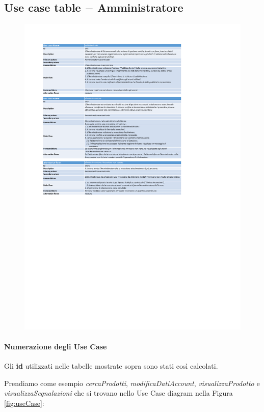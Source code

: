 \subsection{Use case table $-$ Amministratore}
\begin{figure}[h!]
    \centering
    \includegraphics[trim= 1.8cm 13cm 5cm 1.9cm, clip]{Deliverables/first-deliverable/img/UseCase/UseCase-Table-Amministrator.pdf}
\end{figure}

\paragraph{Numerazione degli Use Case}

Gli \textbf{id} utilizzati nelle tabelle mostrate sopra sono stati così calcolati.

Prendiamo come esempio \textit{cercaProdotti}, \textit{modificaDatiAccount}, \textit{visualizzaProdotto} e \textit{visualizzaSegnalazioni} che si trovano nello Use Case diagram nella Figura \ref{fig:useCase}:




